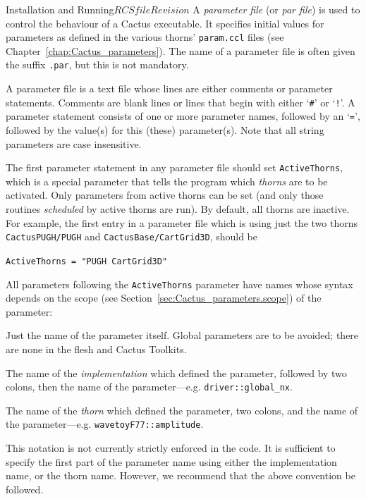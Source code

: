 \begin{cactuspart}{Installation and Running}{$RCSfile$}{$Revision$}
A \textit{parameter file} (or \textit{par file}) is used to control the
behaviour of a Cactus executable.  It specifies initial values for parameters
as defined in the various thorns' \texttt{param.ccl} files
(see Chapter~\ref{chap:Cactus_parameters}).
The name of a parameter file is often given the suffix \texttt{.par}, but
this is not mandatory.

A parameter file is a text file whose lines are either comments
or parameter statements.
Comments are blank lines or lines that begin with either
`\texttt{\#}' or `\texttt{!}'.
A parameter statement
consists of one or more parameter names, followed by
an `\texttt{=}', followed by the value(s) for this (these) parameter(s).
Note that all string parameters are case insensitive.

The first parameter statement in any parameter file should set \texttt{ActiveThorns},
which is a special parameter that tells the
program which \textit{thorns} are to be activated.  Only parameters from active
thorns can be set (and only those routines \textit{scheduled} by active thorns
are run).  By default, all thorns are inactive. For example, the first
entry in a parameter file which is using just the two thorns
\texttt{CactusPUGH/PUGH} and \texttt{CactusBase/CartGrid3D}, should be

\texttt{ActiveThorns = "PUGH CartGrid3D"}

All parameters following the \texttt{ActiveThorns} parameter have names
whose syntax depends on the scope
(see Section~\ref{sec:Cactus_parameters.scope})
of the parameter:
\begin{Lentry}
\item [\texttt{Global parameters}]
Just the name of the parameter itself. Global parameters are to be avoided;
there are none in the flesh and Cactus Toolkits.
\item [\texttt{Restricted parameters}]
The name of the \textit{implementation} which defined the parameter, followed
by two colons,
then the name of the parameter---e.g. \texttt{driver::global\_nx}.
\item [\texttt{Private parameters}]
The name of the \textit{thorn} which defined the parameter, two colons,
and the name of the parameter---e.g. \texttt{wavetoyF77::amplitude}.
\end{Lentry}

This notation is not currently strictly enforced in the code. It is
sufficient to specify the first part of the parameter name using either
the implementation name, or the thorn name. However, we recommend
that the above convention be followed.


\end{cactuspart}
